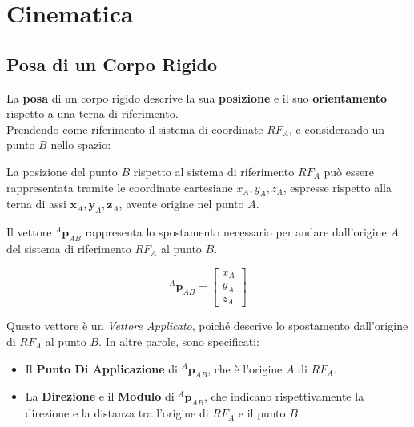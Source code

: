 \documentclass[11pt, a4paper]{report}
\begin{document}

\chapter{Cinematica}
\section{Posa di un Corpo Rigido}

La \textbf{posa} di un corpo rigido descrive la sua \textbf{posizione} e il suo \textbf{orientamento} rispetto a una terna di riferimento.\\
Prendendo come riferimento il sistema di coordinate $RF_A$, e considerando un punto $B$ nello spazio:
\begin{center}
\end{center}
La posizione del punto $B$ rispetto al sistema di riferimento $RF_A$ può essere rappresentata tramite le coordinate cartesiane $x_A, y_A, z_A$, espresse rispetto alla terna di assi $\mathbf{x}_A, \mathbf{y}_A, \mathbf{z}_A$, avente origine nel punto $A$.

Il vettore $^{A}\mathbf{p}_{AB}$ rappresenta lo spostamento necessario per andare dall'origine $A$ del sistema di riferimento $RF_A$ al punto $B$.

\[
    ^{A}\mathbf{p}_{AB} =
    \begin{bmatrix}
        x_A \\
        y_A \\
        z_A
    \end{bmatrix}
\]



Questo vettore è un \textit{Vettore Applicato}, poiché descrive lo spostamento dall'origine di $RF_A$ al punto $B$. In altre parole, sono specificati:
\begin{itemize}
    \item Il \textbf{Punto Di Applicazione} di $^{A}\mathbf{p}_{AB}$, che è l'origine $A$ di $RF_A$.
    \item La \textbf{Direzione} e il \textbf{Modulo} di $^{A}\mathbf{p}_{AB}$, che indicano rispettivamente la direzione e la distanza tra l'origine di $RF_A$ e il punto $B$.
\end{itemize}
\end{document}
